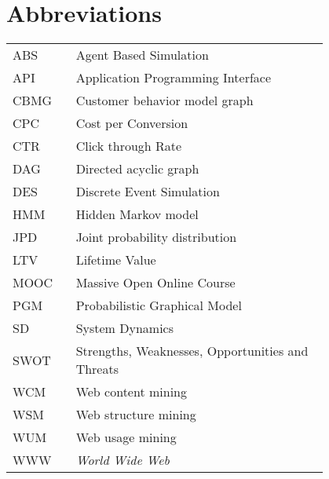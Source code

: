 \chapter*{Abbreviations}

\begin{flushleft}
\begin{tabular}{l p{0.8\linewidth}}
ABS      & Agent Based Simulation\\
API      & Application Programming Interface\\
CBMG     & Customer behavior model graph\\
CPC      & Cost per Conversion\\
CTR      & Click through Rate\\
DAG      & Directed acyclic graph\\
DES      & Discrete Event Simulation\\
HMM      & Hidden Markov model\\
JPD      & Joint probability distribution\\
LTV      & Lifetime Value\\
MOOC     & Massive Open Online Course\\
PGM      & Probabilistic Graphical Model\\
SD       & System Dynamics\\
SWOT     & Strengths, Weaknesses, Opportunities and Threats\\
WCM      & Web content mining\\
WSM      & Web structure mining\\
WUM      & Web usage mining\\
WWW      & \emph{World Wide Web}
\end{tabular}
\end{flushleft}
